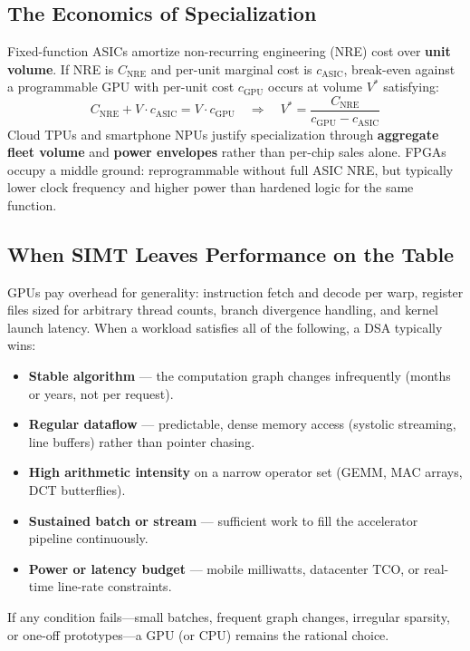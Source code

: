 \documentclass[11pt,journal,onecolumn]{IEEEtran}
\begin{document}
\subsection{The Economics of Specialization}
Fixed-function ASICs amortize non-recurring engineering (NRE) cost over \textbf{unit volume}. If NRE is $C_{\mathrm{NRE}}$ and per-unit marginal cost is $c_{\mathrm{ASIC}}$, break-even against a programmable GPU with per-unit cost $c_{\mathrm{GPU}}$ occurs at volume $V^*$ satisfying:
\begin{equation}
C_{\mathrm{NRE}} + V \cdot c_{\mathrm{ASIC}} = V \cdot c_{\mathrm{GPU}} \quad \Rightarrow \quad V^* = \frac{C_{\mathrm{NRE}}}{c_{\mathrm{GPU}} - c_{\mathrm{ASIC}}}
\end{equation}
Cloud TPUs and smartphone NPUs justify specialization through \textbf{aggregate fleet volume} and \textbf{power envelopes} rather than per-chip sales alone. FPGAs occupy a middle ground: reprogrammable without full ASIC NRE, but typically lower clock frequency and higher power than hardened logic for the same function.

\subsection{When SIMT Leaves Performance on the Table}
GPUs pay overhead for generality: instruction fetch and decode per warp, register files sized for arbitrary thread counts, branch divergence handling, and kernel launch latency. When a workload satisfies all of the following, a DSA typically wins:
\begin{itemize}
    \item \textbf{Stable algorithm} --- the computation graph changes infrequently (months or years, not per request).
    \item \textbf{Regular dataflow} --- predictable, dense memory access (systolic streaming, line buffers) rather than pointer chasing.
    \item \textbf{High arithmetic intensity} on a narrow operator set (GEMM, MAC arrays, DCT butterflies).
    \item \textbf{Sustained batch or stream} --- sufficient work to fill the accelerator pipeline continuously.
    \item \textbf{Power or latency budget} --- mobile milliwatts, datacenter TCO, or real-time line-rate constraints.
\end{itemize}
If any condition fails---small batches, frequent graph changes, irregular sparsity, or one-off prototypes---a GPU (or CPU) remains the rational choice.
\end{document}
